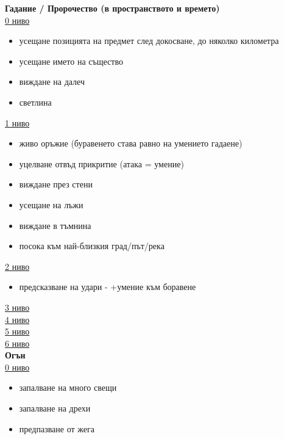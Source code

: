 \vspace{1cm}
\textbf{Гадание / Пророчество (в пространството и времето)}  \\
\underline{0 ниво}  \\
\begin{itemize}
  \item{усещане позицията на предмет след докосване, до няколко километра}
  \item{усещане името на същество}
  \item{виждане на далеч}
  \item{светлина}
\end{itemize}

\underline{1 ниво}  \\
\begin{itemize}
  \item{живо оръжие (буравенето става равно на умението гадаене)}
  \item{уцелване отвъд прикритие (атака = умение)}
  \item{виждане през стени}
  \item{усещане на лъжи}
  \item{виждане в тъмнина}
  \item{посока към най-близкия град/път/река}
\end{itemize}

\underline{2 ниво} \\
\begin{itemize}
\item{предсказване на удари - +умение към боравене}
\end{itemize}

\underline{3 ниво} \\

\underline{4 ниво} \\

\underline{5 ниво} \\

\underline{6 ниво} \\



\vspace{1cm}
\textbf{Огън}  \\
\underline{0 ниво}  \\
\begin{itemize}
  \item{запалване на много свещи}
  \item{запалване на дрехи}
  \item{предпазване от жега}
\end{itemize}

